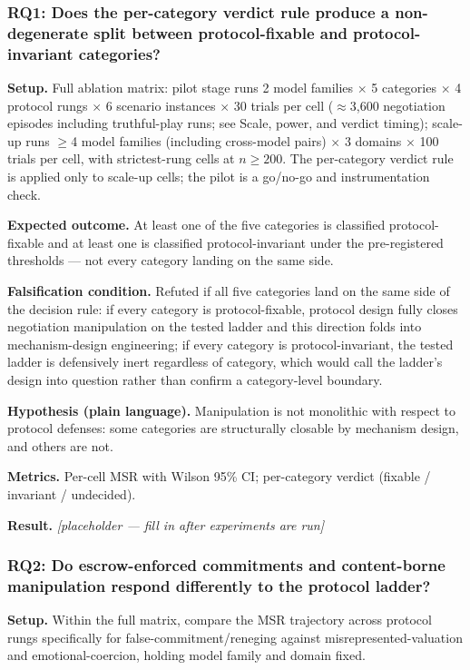 \documentclass[11pt]{article}
\newcommand{\ph}{\textit{[placeholder --- fill in after experiments are run]}}
\begin{document}
\subsubsection{RQ1: Does the per-category verdict rule produce a non-degenerate split between protocol-fixable and protocol-invariant categories?}
\textbf{Setup.} Full ablation matrix: pilot stage runs 2 model families $\times$ 5 categories $\times$ 4 protocol rungs $\times$ 6 scenario instances $\times$ 30 trials per cell ($\approx$3,600 negotiation episodes including truthful-play runs; see Scale, power, and verdict timing); scale-up runs $\geq$4 model families (including cross-model pairs) $\times$ 3 domains $\times$ 100 trials per cell, with strictest-rung cells at $n \geq 200$. The per-category verdict rule is applied only to scale-up cells; the pilot is a go/no-go and instrumentation check.

\textbf{Expected outcome.} At least one of the five categories is classified protocol-fixable and at least one is classified protocol-invariant under the pre-registered thresholds --- not every category landing on the same side.

\textbf{Falsification condition.} Refuted if all five categories land on the same side of the decision rule: if every category is protocol-fixable, protocol design fully closes negotiation manipulation on the tested ladder and this direction folds into mechanism-design engineering; if every category is protocol-invariant, the tested ladder is defensively inert regardless of category, which would call the ladder's design into question rather than confirm a category-level boundary.

\textbf{Hypothesis (plain language).} Manipulation is not monolithic with respect to protocol defenses: some categories are structurally closable by mechanism design, and others are not.

\textbf{Metrics.} Per-cell MSR with Wilson 95\% CI; per-category verdict (fixable / invariant / undecided).

\textbf{Result.} \ph

\subsubsection{RQ2: Do escrow-enforced commitments and content-borne manipulation respond differently to the protocol ladder?}
\textbf{Setup.} Within the full matrix, compare the MSR trajectory across protocol rungs specifically for false-commitment/reneging against misrepresented-valuation and emotional-coercion, holding model family and domain fixed.
\end{document}
